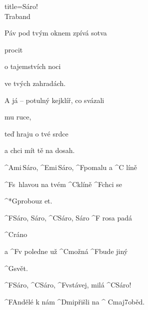 \begin{song}{title=\predtitle\centering Sáro! \\\large Traband  \vspace*{-0.3cm}}
{\begin{centerjustified}
\begin{varwidth}[t]{0.48\textwidth}
\sloka
	Páv pod tvým oknem zpívá sotva 

	procit

	o tajemstvích noci

	ve tvých zahradách.

	A já -- potulný kejklíř, co svázali 

	mu ruce,

	teď hraju o tvé srdce

	a chci mít tě na dosah.

\sloka
	^{Ami\,}Sáro, ^{Emi\,}Sáro, ^{F\z}pomalu a ^{C\,\,}líně

	^{F\z}s~hlavou na tvém ^{C\z}klíně ^{F\z}chci se

	^*{{\z}G}probouz et.

	^{F{\z}}Sáro, Sáro, ^{C}Sáro, Sáro ^{F\,\,}rosa padá

	^{C\z}ráno

	a ^{F}v poledne už ^{C{\z}}možná ^{F{\z}}bude jiný

	^{G\z}svět.

	^{F{\z}}Sáro, ^{C{\z}}Sáro, ^{F{\z}}vstávej, milá ^{C{\z}}Sáro!

	^{F{\z}}Andělé k nám ^{Dmi}přišli na ^{\,\,Cmaj7}oběd.


\end{varwidth}

\end{centerjustified}
}
\setcounter{Slokočet}{0}
\end{song}
